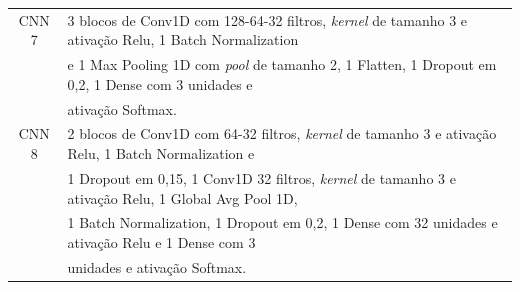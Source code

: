 \begin{table}[h!]
\begin{tabular}{cl}
CNN 7 &  3 blocos de Conv1D com 128-64-32 filtros, \textit{kernel} de tamanho 3 e ativação Relu, 1 Batch Normalization \\ & e 1  Max Pooling 1D com \textit{pool} de tamanho 2, 1 Flatten, 1 Dropout em 0,2, 1 Dense com 3 unidades e \\ & ativação Softmax. \\ \midrule
CNN 8 & 2 blocos de Conv1D com 64-32 filtros, \textit{kernel} de tamanho 3 e ativação Relu, 1 Batch Normalization e \\ & 1 Dropout  em 0,15, 1 Conv1D 32 filtros, \textit{kernel} de tamanho 3 e ativação Relu, 1 Global Avg Pool 1D,  \\ & 1 Batch Normalization, 1 Dropout em 0,2, 1 Dense com 32 unidades e ativação Relu e 1 Dense com 3 \\ & unidades e ativação Softmax. \\ \bottomrule
\end{tabular}
\end{table}

